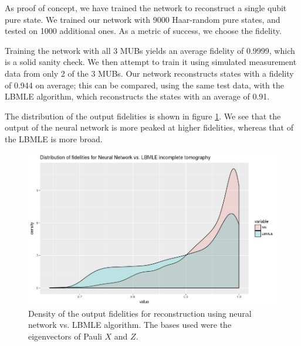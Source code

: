 \documentclass[a4paper,10pt]{article}
\begin{document}
As proof of concept, we have trained the network to reconstruct a single qubit pure state. We trained our network with 9000 Haar-random pure states, and tested on 1000 additional ones. As a metric of success, we choose the fidelity. 

Training the network with all 3 MUBs yields an average fidelity of 0.9999, which is a solid sanity check. We then attempt to train it using simulated measurement data from only 2 of the 3 MUBs.  Our network reconstructs states with a fidelity of 0.944 on average; this can be compared, using the same test data, with the LBMLE algorithm, which reconstructs the states with an average of 0.91.

The distribution of the output fidelities is shown in figure \ref{fig:fids_dim2}. We see that the output of the neural network is more peaked at higher fidelities, whereas that of the LBMLE is more broad.
\begin{figure}
 \includegraphics[scale=0.5]{fids_dim2}
 \caption{Density of the output fidelities for reconstruction using neural network vs. LBMLE algorithm. The bases used were the eigenvectors of Pauli $X$ and $Z$.}
 \label{fig:fids_dim2}
\end{figure}
\end{document}
